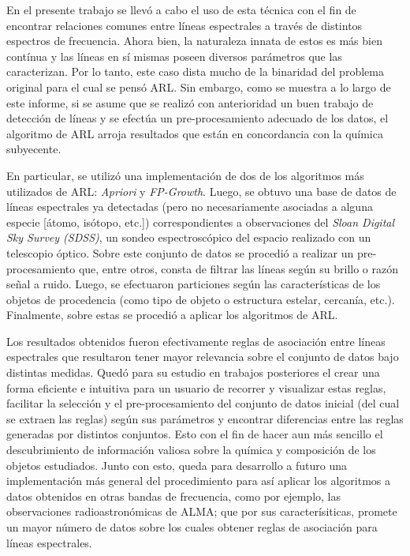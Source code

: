 \begin{intro}
En el presente trabajo se llevó a cabo el uso de esta técnica con el fin de encontrar relaciones comunes entre líneas espectrales a través de distintos espectros de frecuencia. Ahora bien, la naturaleza innata de estos es más bien contínua y las líneas en sí mismas poseen diversos parámetros que las caracterizan. Por lo tanto, este caso dista mucho de la binaridad del problema original para el cual se pensó ARL. Sin embargo, como se muestra a lo largo de este informe, si se asume que se realizó con anterioridad un buen trabajo de detección de líneas y se efectúa un pre-procesamiento adecuado de los datos, el algoritmo de ARL arroja resultados que están en concordancia con la química subyecente.

En particular, se utilizó una implementación de dos de los algoritmos más utilizados de ARL: \textit{Apriori} y \textit{FP-Growth}. Luego, se obtuvo una base de datos de líneas espectrales ya detectadas (pero no necesariamente asociadas a alguna especie [átomo, isótopo, etc.]) correspondientes a observaciones del \textit{Sloan Digital Sky Survey (SDSS)}, un sondeo espectroscópico del espacio realizado con un telescopio óptico. Sobre este conjunto de datos se procedió a realizar un pre-procesamiento que, entre otros, consta de filtrar las líneas según su brillo o razón señal a ruido. Luego, se efectuaron particiones según las características de los objetos de procedencia (como tipo de objeto o estructura estelar, cercanía, etc.). Finalmente, sobre estas se procedió a aplicar los algoritmos de ARL.

Los resultados obtenidos fueron efectivamente reglas de asociación entre líneas espectrales que resultaron tener mayor relevancia sobre el conjunto de datos bajo distintas medidas. Quedó para su estudio en trabajos posteriores el crear una forma eficiente e intuitiva para un usuario de recorrer y visualizar estas reglas, facilitar la selección y el pre-procesamiento del conjunto de datos inicial (del cual se extraen las reglas) según sus parámetros y encontrar diferencias entre las reglas generadas por distintos conjuntos. Esto con el fin de hacer aun más sencillo el descubrimiento de información valiosa sobre la química y composición de los objetos estudiados. Junto con esto, queda para desarrollo a futuro una implementación más general del procedimiento para así aplicar los algoritmos a datos obtenidos en otras bandas de frecuencia, como por ejemplo, las observaciones radioastronómicas de ALMA; que por sus caracterísiticas, promete un mayor número de datos sobre los cuales obtener reglas de asociación para líneas espectrales.

\end{intro}